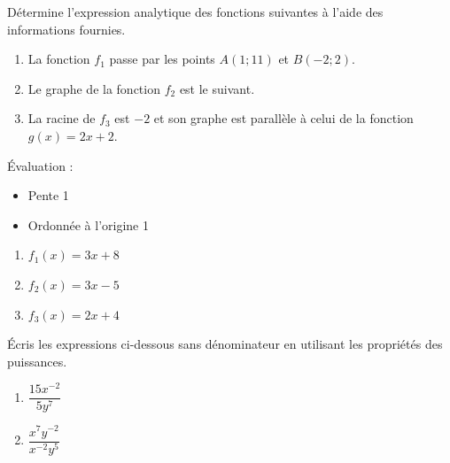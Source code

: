 \documentclass[../partie1.tex]{subfiles}
\begin{document}
\begin{exercise}[points=6]
    Détermine l'expression analytique des fonctions suivantes à l'aide des informations fournies.
    \begin{enumerate}
        \item La fonction $f_1$ passe par les points $A(1;11)$ et $B(-2;2)$.
        \item Le graphe de la fonction $f_2$ est le suivant. 
        \item La racine de $f_3$ est $-2$ et son graphe est parallèle à celui de la fonction $g(x) = 2x + 2$.
    \end{enumerate}
\end{exercise}
\begin{solution}
    Évaluation :
    \begin{itemize}
        \item Pente \hfill 1
        \item Ordonnée à l'origine \hfill 1
    \end{itemize}
    \begin{enumerate}[cols=3]
        \item $f_1(x) = 3x + 8$
        \item $f_2(x) = 3x - 5$
        \item $f_3(x) = 2x + 4$
    \end{enumerate}
\end{solution}
\begin{exercise}[points=1]
    Écris les expressions ci-dessous sans dénominateur en utilisant les propriétés des puissances.
    \begin{enumerate}[cols=2]
        \item $\dfrac{15x^{-2}}{5y^7}$
        \item $\dfrac{x^7 y^{-2}}{x^{-2}y^5}$
    \end{enumerate}
\end{exercise}
\end{document}

